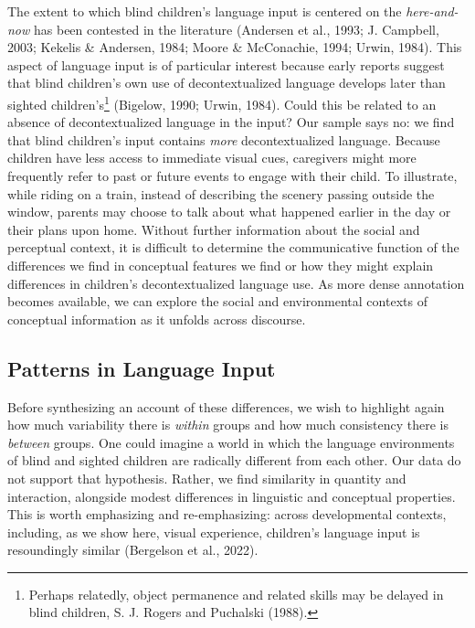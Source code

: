 \documentclass[
  man]{apa6}
\begin{document}
The extent to which blind children's language input is centered on the \emph{here-and-now} has been contested in the literature (Andersen et al., 1993; J. Campbell, 2003; Kekelis \& Andersen, 1984; Moore \& McConachie, 1994; Urwin, 1984). This aspect of language input is of particular interest because early reports suggest that blind children's own use of decontextualized language develops later than sighted children's\footnote{Perhaps relatedly, object permanence and related skills may be delayed in blind children, S. J. Rogers and Puchalski (1988).} (Bigelow, 1990; Urwin, 1984). Could this be related to an absence of decontextualized language in the input? Our sample says no: we find that blind children's input contains \emph{more} decontextualized language. Because children have less access to immediate visual cues, caregivers might more frequently refer to past or future events to engage with their child. To illustrate, while riding on a train, instead of describing the scenery passing outside the window, parents may choose to talk about what happened earlier in the day or their plans upon home. Without further information about the social and perceptual context, it is difficult to determine the communicative function of the differences we find in conceptual features we find or how they might explain differences in children's decontextualized language use. As more dense annotation becomes available, we can explore the social and environmental contexts of conceptual information as it unfolds across discourse.

\hypertarget{patterns-in-language-input}{%
\subsection{Patterns in Language Input}\label{patterns-in-language-input}}

Before synthesizing an account of these differences, we wish to highlight again how much variability there is \emph{within} groups and how much consistency there is \emph{between} groups. One could imagine a world in which the language environments of blind and sighted children are radically different from each other. Our data do not support that hypothesis. Rather, we find similarity in quantity and interaction, alongside modest differences in linguistic and conceptual properties. This is worth emphasizing and re-emphasizing: across developmental contexts, including, as we show here, visual experience, children's language input is resoundingly similar (Bergelson et al., 2022).
\end{document}
